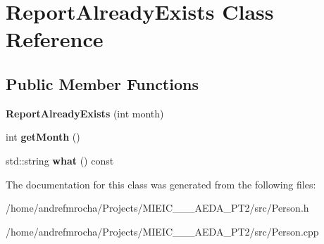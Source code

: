 \hypertarget{class_report_already_exists}{}\section{Report\+Already\+Exists Class Reference}
\label{class_report_already_exists}
\subsection*{Public Member Functions}
\begin{DoxyCompactItemize}
\item 
\mbox{\label{class_report_already_exists_add9175e1939193586e63a421bf9d2870}} 
{\bfseries Report\+Already\+Exists} (int month)
\item 
\mbox{\label{class_report_already_exists_a1521d7f897144a910951b37f132cd922}} 
int {\bfseries get\+Month} ()
\item 
\mbox{\label{class_report_already_exists_a66103e5ca6a4b84f3492493b7ced740d}} 
std\+::string {\bfseries what} () const
\end{DoxyCompactItemize}


The documentation for this class was generated from the following files\+:\begin{DoxyCompactItemize}
\item 
/home/andrefmrocha/\+Projects/\+M\+I\+E\+I\+C\+\_\+\_\+\_\+\+A\+E\+D\+A\+\_\+\+P\+T2/src/Person.\+h\item 
/home/andrefmrocha/\+Projects/\+M\+I\+E\+I\+C\+\_\+\_\+\_\+\+A\+E\+D\+A\+\_\+\+P\+T2/src/Person.\+cpp\end{DoxyCompactItemize}
